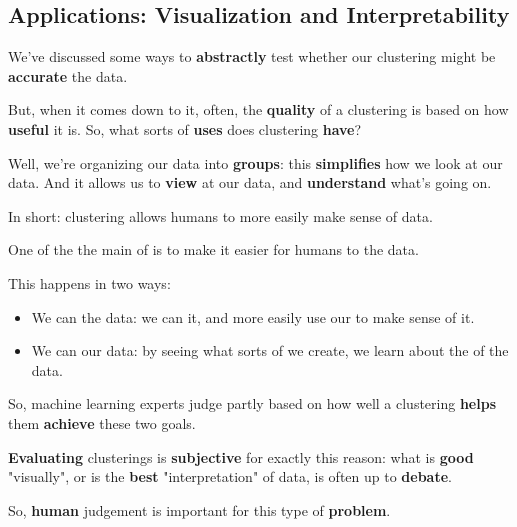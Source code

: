     \subsection{Applications: Visualization and Interpretability}
    
        We've discussed some ways to \textbf{abstractly} test whether our clustering might be \textbf{accurate} the data.
        
        But, when it comes down to it, often, the \textbf{quality} of a clustering is based on how \textbf{useful} it is. So, what sorts of \textbf{uses} does clustering \textbf{have}? 
        
        Well, we're organizing our data into \textbf{groups}: this \textbf{simplifies} how we look at our data. And it allows us to \textbf{view} at our data, and \textbf{understand} what's going on.
        
        In short: clustering allows humans to more easily make sense of data.\\
        
        \begin{concept}
            One of the the main  of  is to make it easier for humans to  the data.
            
            This happens in two ways:
            
            \begin{itemize}
                \item We can  the data: we can  it, and more easily use our  to make sense of it.
                
                \item We can  our data: by seeing what sorts of  we create, we learn about the  of the data.
            \end{itemize}
        \end{concept}
        
        So, machine learning experts judge partly based on how well a clustering \textbf{helps} them \textbf{achieve} these two goals.
        
        \textbf{Evaluating} clusterings is \textbf{subjective} for exactly this reason: what is \textbf{good} "visually", or is the \textbf{best} "interpretation" of data, is often up to \textbf{debate}.
        
        So, \textbf{human} judgement is important for this type of \textbf{problem}.
    
